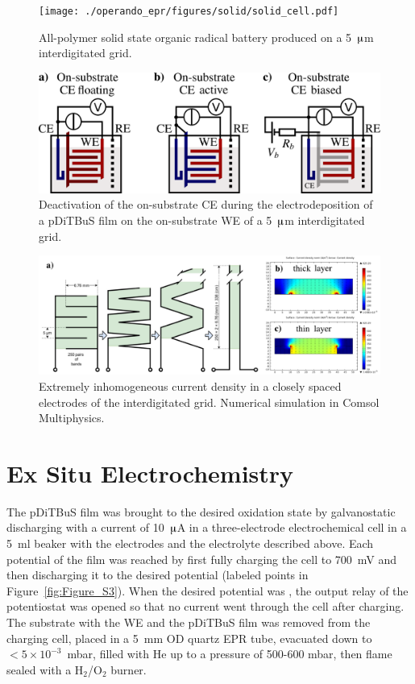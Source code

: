 \begin{figure}[h]
\center
	\texttt{[image: ./operando\_epr/figures/solid/solid\_cell.pdf]}
	\caption{All-polymer solid state organic radical battery produced on a 5~$\muup$m interdigitated grid.}
	\label{fig:transistor_battery_assewmbly}
\end{figure}


\begin{figure}[h]
\center
	\includegraphics[width=1\textwidth]{./operando_epr/figures/solid/separate_deposition.pdf}
	\caption{Deactivation of the on-substrate CE during the electrodeposition of a pDiTBuS film on the on-substrate WE of a 5~$\muup$m interdigitated grid.}
	\label{fig:transistor_battery_deposition}
\end{figure}

\begin{figure}[h]
\center
	\includegraphics[width=1\textwidth]{./operando_epr/figures/solid/current_density.pdf}
	\caption{Extremely inhomogeneous current density in a closely spaced electrodes of the interdigitated grid. Numerical simulation in Comsol Multiphysics.}
	\label{fig:grid_current_density_sumulation}
\end{figure}



\section{Ex Situ Electrochemistry}
\label{sample_fab_2}
The pDiTBuS film was brought to the desired oxidation state by galvanostatic discharging with a current of 10~$\muup$A in a three-electrode electrochemical cell in a 5~ml beaker with the electrodes and the electrolyte described above.
Each potential of the film was reached by first fully charging the cell to 700~mV and then discharging it to the desired potential (labeled points in Figure~\ref{fig:Figure_S3}). When the desired potential was , the output relay of the potentiostat was opened so that no current went through the cell after charging. The substrate with the WE and the pDiTBuS film was removed from the charging cell, placed in a 5~mm OD quartz EPR tube, evacuated down to $<5\times10^{-3}$~mbar, filled with He up to a pressure of 500-600 mbar, then flame sealed with a H$_2$/O$_2$ burner.

